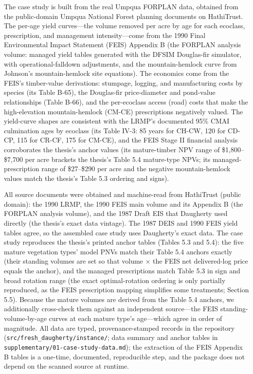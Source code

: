The case study is built from the real Umpqua FORPLAN data, obtained from the public-domain Umpqua National Forest planning documents on HathiTrust. The per-age yield curves---the volume removed per acre by age for each ecoclass, prescription, and management intensity---come from the 1990 Final Environmental Impact Statement (FEIS) Appendix B \citep{usda1990umpqua} (the FORPLAN analysis volume: managed yield tables generated with the DFSIM Douglas-fir simulator, with operational-falldown adjustments, and the mountain-hemlock curve from Johnson's mountain-hemlock site equations). The economics come from the FEIS's timber-value derivations: stumpage, logging, and manufacturing costs by species (its Table B-65), the Douglas-fir price-diameter and pond-value relationships (Table B-66), and the per-ecoclass access (road) costs that make the high-elevation mountain-hemlock (CM-CE) prescriptions negatively valued. The yield-curve shapes are consistent with the LRMP's documented 95\% CMAI culmination ages by ecoclass (its Table IV-3: 85 years for CH-CW, 120 for CD-CP, 115 for CR-CF, 175 for CM-CE), and the FEIS Stage II financial analysis corroborates the thesis's anchor values (its mature-timber NPV range of \$1,800--\$7,700 per acre brackets the thesis's Table 5.4 mature-type NPVs; its managed-prescription range of \$27--\$290 per acre and the negative mountain-hemlock values match the thesis's Table 5.3 ordering and signs).

All source documents were obtained and machine-read from HathiTrust (public domain): the 1990 LRMP, the 1990 FEIS main volume and its Appendix B (the FORPLAN analysis volume), and the 1987 Draft EIS \citep{usda1987umpqua} that Daugherty used directly (the thesis's exact data vintage). The 1987 DEIS and 1990 FEIS yield tables agree, so the assembled case study uses Daugherty's exact data. The case study reproduces the thesis's printed anchor tables (Tables 5.3 and 5.4): the five mature vegetation types' model PNVs match their Table 5.4 anchors exactly (their standing volumes are set so that volume $\times$ the FEIS net delivered-log price equals the anchor), and the managed prescriptions match Table 5.3 in sign and broad rotation range (the exact optimal-rotation ordering is only partially reproduced, as the FEIS prescription mapping simplifies some treatments; Section 5.5). Because the mature volumes are derived from the Table 5.4 anchors, we additionally cross-check them against an independent source---the FEIS standing-volume-by-age curves at each mature type's age---which agree in order of magnitude. All data are typed, provenance-stamped records in the repository (\texttt{src/fresh\_daugherty/instance/}; data summary and anchor tables in \texttt{supplementary/01-case-study-data.md}); the extraction of the FEIS Appendix B tables is a one-time, documented, reproducible step, and the package does not depend on the scanned source at runtime.

